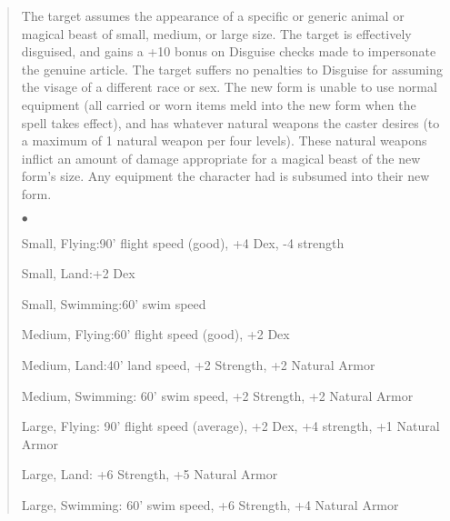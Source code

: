 \begin{quote}
\begin{small}
\end{small}

The target assumes the appearance of a specific or generic animal or magical beast of small, medium, or large size. The target is effectively disguised, and gains a +10 bonus on Disguise checks made to impersonate the genuine article. The target suffers no penalties to Disguise for assuming the visage of a different race or sex. The new form is unable to use normal equipment (all carried or worn items meld into the new form when the spell takes effect), and has whatever natural weapons the caster desires (to a maximum of 1 natural weapon per four levels). These natural weapons inflict an amount of damage appropriate for a magical beast of the new form's size. Any equipment the character had is subsumed into their new form.
\begin{list}{$\bullet$}{\itemspace}
    \item Small, Flying:90' flight speed (good), +4 Dex, -4 strength
    \item Small, Land:+2 Dex
    \item Small, Swimming:60' swim speed
    \item Medium, Flying:60' flight speed (good), +2 Dex
    \item Medium, Land:40' land speed, +2 Strength, +2 Natural Armor
    \item Medium, Swimming: 60' swim speed, +2 Strength, +2 Natural Armor
    \item Large, Flying: 90' flight speed (average), +2 Dex, +4 strength, +1 Natural Armor
    \item Large, Land: +6 Strength, +5 Natural Armor
    \item Large, Swimming: 60' swim speed, +6 Strength, +4 Natural Armor
\end{list}
\end{quote}


